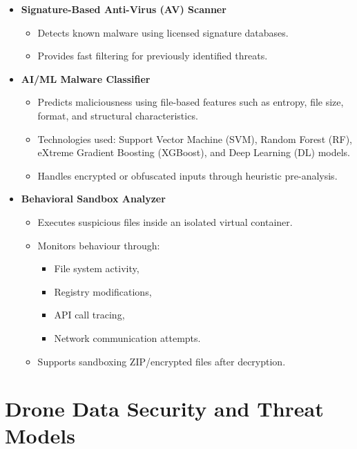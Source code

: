 \documentclass[12pt, a4paper]{report}
\begin{document}
\begin{itemize}
    \item \textbf{Signature-Based Anti-Virus (AV) Scanner}
    \begin{itemize}
        \item Detects known malware using licensed signature databases.
        \item Provides fast filtering for previously identified threats.
    \end{itemize}

    \item \textbf{AI/ML Malware Classifier}
    \begin{itemize}
        \item Predicts maliciousness using file-based features such as entropy, file size,
              format, and structural characteristics.
        \item Technologies used: Support Vector Machine (SVM), Random Forest (RF),
              eXtreme Gradient Boosting (XGBoost), and Deep Learning (DL) models.
        \item Handles encrypted or obfuscated inputs through heuristic pre-analysis.
    \end{itemize}

    \item \textbf{Behavioral Sandbox Analyzer}
    \begin{itemize}
        \item Executes suspicious files inside an isolated virtual container.
        \item Monitors behaviour through:
        \begin{itemize}
            \item File system activity,
            \item Registry modifications,
            \item API call tracing,
            \item Network communication attempts.
        \end{itemize}
        \item Supports sandboxing ZIP/encrypted files after decryption.
    \end{itemize}
\end{itemize}

\section{Drone Data Security and Threat Models}
\end{document}
